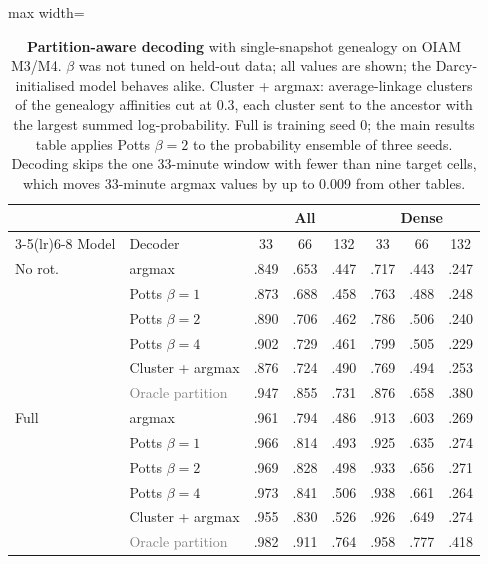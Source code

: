 \begin{table}[t]
\centering\small
\setlength{\tabcolsep}{3.5pt}
\begin{adjustbox}{max width=\linewidth}
\begin{tabular}{llcccccc}
\toprule
& & \multicolumn{3}{c}{All} & \multicolumn{3}{c}{Dense} \\
\cmidrule(lr){3-5}\cmidrule(lr){6-8}
Model & Decoder & 33 & 66 & 132 & 33 & 66 & 132 \\
\midrule
No rot. & argmax & .849 & .653 & .447 & .717 & .443 & .247 \\
 & Potts $\beta{=}1$ & .873 & .688 & .458 & .763 & .488 & .248 \\
 & Potts $\beta{=}2$ & .890 & .706 & .462 & .786 & .506 & .240 \\
 & Potts $\beta{=}4$ & .902 & .729 & .461 & .799 & .505 & .229 \\
 & Cluster + argmax & .876 & .724 & .490 & .769 & .494 & .253 \\
 & \textcolor{gray}{Oracle partition} & .947 & .855 & .731 & .876 & .658 & .380 \\
\midrule
Full & argmax & .961 & .794 & .486 & .913 & .603 & .269 \\
 & Potts $\beta{=}1$ & .966 & .814 & .493 & .925 & .635 & .274 \\
 & Potts $\beta{=}2$ & .969 & .828 & .498 & .933 & .656 & .271 \\
 & Potts $\beta{=}4$ & .973 & .841 & .506 & .938 & .661 & .264 \\
 & Cluster + argmax & .955 & .830 & .526 & .926 & .649 & .274 \\
 & \textcolor{gray}{Oracle partition} & .982 & .911 & .764 & .958 & .777 & .418 \\
\bottomrule
\end{tabular}
\end{adjustbox}
\caption{\textbf{Partition-aware decoding} with single-snapshot genealogy on OIAM M3/M4. $\beta$ was not tuned on held-out data; all values are shown; the Darcy-initialised model behaves alike. Cluster + argmax: average-linkage clusters of the genealogy affinities cut at 0.3, each cluster sent to the ancestor with the largest summed log-probability. Full is training seed 0; the main results table applies Potts $\beta{=}2$ to the probability ensemble of three seeds. Decoding skips the one 33-minute window with fewer than nine target cells, which moves 33-minute argmax values by up to 0.009 from other tables.}
\label{tab:decoder}
\end{table}

